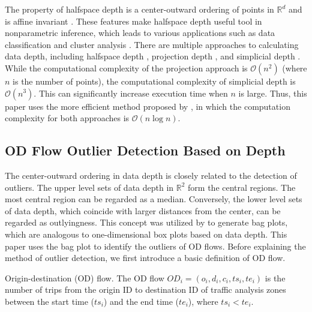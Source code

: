 \documentclass[a4paper,UKenglish]{lipics-v2018}
\begin{document}
The property of halfspace depth is a center-outward ordering of points in  $\mathbb{R}^d$ and is affine invariant \cite{Mosler13book}. These features make halfspace depth useful tool in nonparametric inference, which leads to various applications such as data classification and cluster analysis
\cite{lange14fSP,jeong16acmgis}. There are multiple approaches to calculating data depth, including halfspace depth \cite{rousseeuw96RSS}, projection depth \cite{wilcox03CSSC}, and simplicial depth \cite{liu90AS}. While the computational complexity of the projection approach is $\mathcal{O}(n^2)$ (where $n$ is the number of points), the computational complexity of simplicial depth is $\mathcal{O}(n^3)$. This can significantly increase execution time when $n$ is large. Thus, this paper uses the more efficient method proposed by \cite{rousseeuw96RSS}, in which the computation complexity for both approaches is $\mathcal{O}(n\log{}n)$.



\subsection{OD Flow Outlier Detection Based on Depth}
The center-outward ordering in data depth is closely related to the detection of outliers. The upper level sets of data depth in $\mathbb{R}^2$ form the central regions. The most central region can be regarded as a median. Conversely, the lower level sets of data depth, which coincide with larger distances from the center, can be regarded as outlyingness. This concept was utilized by \cite{rousseeuw99AS,aplpackR} to generate bag plots, which are analogous to one-dimensional box plots based on data depth. This paper uses the bag plot to identify the outliers of OD flows. Before explaining the method of outlier detection, we first introduce a basic definition of OD flow.

%
%

\begin{definition}{Origin-destination (OD) flow.}
	The OD flow $OD_i = (o_i,d_i,c_i,ts_i, te_i)$ is the number of trips from the origin ID to destination ID of traffic analysis zones between the start time ($ts_i$) and the end time ($te_i$), where $ts_i<te_i$.
\end{definition}
\end{document}
